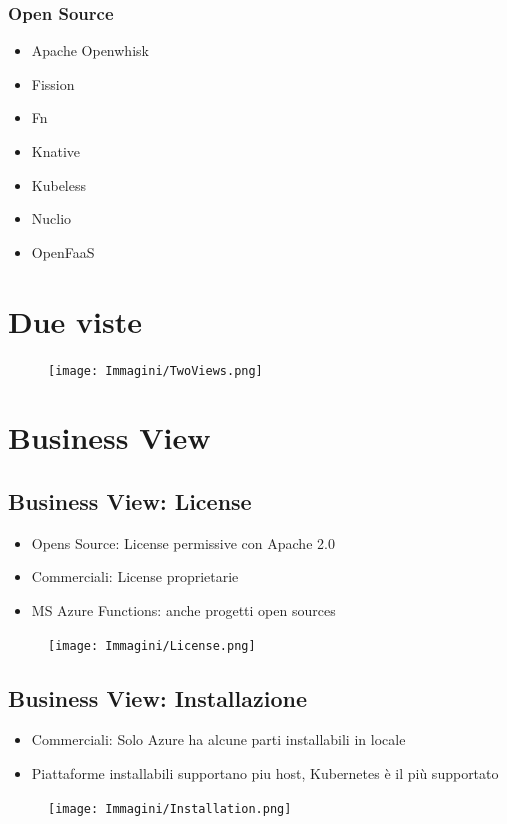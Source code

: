 \documentclass[a4paper, 12pt]{report}
\begin{document}
          \subsubsection{Open Source}
          \begin{itemize}
            \item Apache Openwhisk
            \item Fission
            \item Fn
            \item Knative
            \item Kubeless
            \item Nuclio
            \item OpenFaaS
          \end{itemize}
          \section{Due viste}
          \begin{figure}[h]
            \centering
            \texttt{[image: Immagini/TwoViews.png]}
          \end{figure}
          \section{Business View}
          \subsection{Business View: License}
            \begin{itemize}
              \item Opens Source: License permissive con Apache 2.0
              \item Commerciali: License proprietarie
              \item MS Azure Functions: anche progetti open sources
            \end{itemize}
            \begin{figure}[h]
              \centering
              \texttt{[image: Immagini/License.png]}
            \end{figure}
            \subsection{Business View: Installazione}
            \begin{itemize}
              \item Commerciali: Solo Azure ha alcune parti installabili in locale
              \item Piattaforme installabili supportano piu host, Kubernetes è il più supportato
            \end{itemize}
            \begin{figure}[h]
              \centering
              \texttt{[image: Immagini/Installation.png]}
            \end{figure}
            \clearpage
\end{document}
